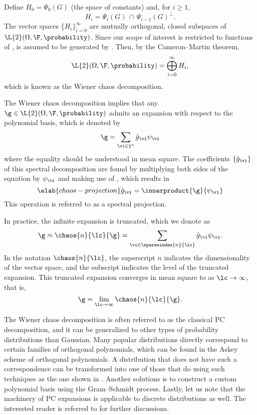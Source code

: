 Define $H_0 = \Psi_0(G)$ (the space of constants) and, for $i \geq 1$,
\[
  H_i = \Psi_i(G) \, \cap \, \Psi_{i - 1}(G)^\perp.
\]
The vector spaces $\{ H_i \}_{i = 0}^\infty$ are mutually orthogonal, closed
subspaces of $\L{2}(\Omega, \F, \probability)$. Since our scope of interest is
restricted to functions of \vx, \F is assumed to be generated by \vx. Then, by
the Cameron--Martin theorem,
\[
  \L{2}(\Omega, \F, \probability) = \bigoplus_{i = 0}^\infty H_i,
\]
which is known as the Wiener chaos decomposition.

The Wiener chaos decomposition implies that any $\g \in \L{2}(\Omega, \F,
\probability)$ admits an expansion with respect to the polynomial basis, which
is denoted by
\[
  \g = \sum_{\vi \in \natural^n} \hat{g}_{\vi} \psi_{\vi}
\]
where the equality should be understood in mean square. The coefficients $\{
\hat{g}_{\vi} \}$ of this spectral decomposition are found by multiplying both
sides of the equation by $\psi_{\vi}$ and making use of
, which results in
\begin{equation} \elab{chaos-projection}
  \hat{g}_{\vi} = \innerproduct{\g}{\psi_{\vi}}
\end{equation}
This operation is referred to as a spectral projection.

In practice, the infinite expansion is truncated, which we denote as
\[
  \g \approx \chaos{n}{\lc}{\g} = \sum_{\vi \in \sparseindex{n}{\lc}} \hat{g}_{\vi} \psi_{\vi}.
\]
In the notation $\chaos{n}{\lc}$, the superscript $n$ indicates the
dimensionality of the vector space, and the subscript \lc indicates the level of
the truncated expansion. This truncated expansion converges in mean square to \g
as $\lc \to \infty$, that is,
\[
  \g = \lim_{\lc \to \infty} \chaos{n}{\lc}{\g}.
\]

The Wiener chaos decomposition is often referred to as the classical \acf{PC}
decomposition, and it can be generalized to other types of probability
distributions than Gaussian. Many popular distributions directly correspond to
certain families of orthogonal polynomials, which can be found in the Askey
scheme of orthogonal polynomials. A distribution that does not have such a
correspondence can be transformed into one of those that do using such
techniques as the one shown in . Another
solutions is to construct a custom polynomial basis using the Gram--Schmidt
process. Lastly, let us note that the machinery of \ac{PC} expansions is
applicable to discrete distributions as well. The interested reader is referred
to \cite{xiu2010} for further discussions.
